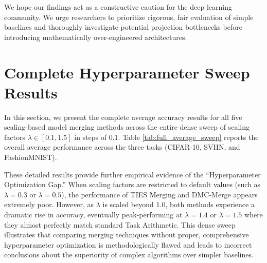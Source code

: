 \documentclass{article}
\begin{document}
We hope our findings act as a constructive caution for the deep learning community. We urge researchers to prioritize rigorous, fair evaluation of simple baselines and thoroughly investigate potential projection bottlenecks before introducing mathematically over-engineered architectures.

\clearpage

\nocite{Marczak2025NoTL,Wu2025UnlockingEL,Cheng2025WhoeverST,Chen2025BringRT,Wei2025ModelingMM,Li2025ModelMI,Tang2025MergingMO,Corbeil2025AMA,Yang2025MixDO,Yuan2025SuperficialSR,Gargiulo2024TaskSV,Yang2023AdaMergingAM,Panariello2025AccurateAE,Kuo2025ExactUO,Du2025AdaMMSMM,Nikishin2018ImprovingSI,Cao2024DeepNN,Gu2023HierarchicalWA,Morales-Brotons2024ExponentialMA,Ran2022ImprovedRF,Wang2024AUA,Shin2020SQWASQ,Athiwaratkun2018ImprovingCS,Guo2022StochasticWA,Nam2022ImprovingED,Shen2023ShortTermLF,Kaddour2022AFC,Nakai-Kasai2022DeepUW,Maddox2019ASB,Seckler2022BayesianDL,Ilharco2022EditingMW,Bhardwaj2024LanguageMA,Yoshida2025MasteringTA,Dai2025LeveragingSL,Sun2025TaskAI,Zhou2024MetaGPTML,Braga2025InvestigatingTA,He2024LocalizeandStitchEM,Naganuma2025OnFO,Ritter-Gutierrez2025DistillingAS,Ortiz-Jiménez2023TaskAI,Singal2025TaskAF,Jin2024FineTuningAM,Su2024TaskAC,Shirafuji2024BiasVM,Yadav2023TIESMergingRI,Galvão2025OptimizingMM,Pala2024DELLAMergingRI,Yadav2024WhatMF,Tidey2018MergingQL,Xu2025ZJUKLABAS,Wang2025ModelMS,Kodali2025AdaptingMM,Zhang2025ResidentialSA,Ueda2025MergingCP}



\clearpage
\appendix
\section{Complete Hyperparameter Sweep Results}
\label{appendix:sweep_results}
In this section, we present the complete average accuracy results for all five scaling-based model merging methods across the entire dense sweep of scaling factors $\lambda \in [0.1, 1.5]$ in steps of 0.1. Table \ref{tab:full_average_sweep} reports the overall average performance across the three tasks (CIFAR-10, SVHN, and FashionMNIST).

These detailed results provide further empirical evidence of the ``Hyperparameter Optimization Gap.'' When scaling factors are restricted to default values (such as $\lambda = 0.3$ or $\lambda = 0.5$), the performance of TIES Merging and DMC-Merge appears extremely poor. However, as $\lambda$ is scaled beyond 1.0, both methods experience a dramatic rise in accuracy, eventually peak-performing at $\lambda = 1.4$ or $\lambda = 1.5$ where they almost perfectly match standard Task Arithmetic. This dense sweep illustrates that comparing merging techniques without proper, comprehensive hyperparameter optimization is methodologically flawed and leads to incorrect conclusions about the superiority of complex algorithms over simpler baselines.
\end{document}
